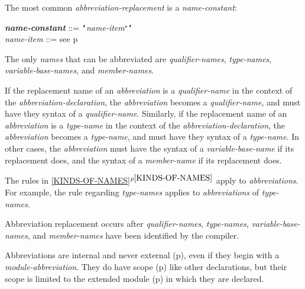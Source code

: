 \documentclass[12pt]{article}
\makeatletter
\newcommand{\TT}[1]{{\tt \bfseries #1}}
\newcommand{\emkey}[1]{{\bf \em #1}\index{#1@{\em #1}}}
\newcommand{\itemref}[1]{\ref{#1}$^{p\pageref{#1}}$}
\newcommand{\pagref}[1]{p\pageref{#1}}
\newcommand{\STAR}{{\Large $^\star$}}
\newenvironment{indpar}[1][0.3in]%
	{\begin{list}{}%
		     {\setlength{\itemsep}{0in}%
		      \setlength{\topsep}{0in}%
		      \setlength{\parsep}{1ex}%
		      \setlength{\labelwidth}{#1}%
		      \setlength{\leftmargin}{#1}%
		      \addtolength{\leftmargin}{\labelsep}}%
	 \item}%
	{\end{list}}
\makeatother
\begin{document}
The most common {\em abbreviation-replacement} is a {\em name-constant}:

\begin{indpar}
\emkey{name-constant}
    ::= \TT{`}{\em name-item}\STAR{}\TT{'} \\
{\em name-item} ::= see \pagref{NAME-ITEM}
\end{indpar}

The only {\em names}
that can be abbreviated are {\em qualifier-names},
{\em type-names}, {\em variable-base-names}, and
{\em member-names}.

If the replacement name of an {\em abbreviation} is a {\em qualifier-name}
in the context of the {\em abbreviation-declaration},
the {\em abbreviation} becomes a {\em qualifier-name}, and
must have they syntax of a {\em qualifier-name}.
Similarly, if the replacement name of an {\em abbreviation} is a {\em type-name}
in the context of the {\em abbreviation-declaration},
the {\em abbreviation} becomes a {\em type-name}, and
must have they syntax of a {\em type-name}.
In other cases, the {\em abbreviation} must have the syntax of
a {\em variable-base-name} if its replacement does, and the syntax of
a {\em member-name} if its replacement does.

The rules in \itemref{KINDS-OF-NAMES}
apply to {\em abbreviations}.  For example, the rule regarding
{\em type-names} applies to {\em abbreviations}
of {\em type-names}.

Abbreviation replacement occurs after
{\em qualifier-names},
{\em type-names}, {\em variable-base-names}, and
{\em member-names} have been identified by the compiler.

Abbreviations are internal and never external (\pagref{EXTERNAL}),%
\label{ABBREVIATIONS-ARE-INTERNAL}
even if they begin with a {\em module-abbreviation}.
They do have scope (\pagref{SCOPE}) like other declarations, but their scope
is limited to the extended module (\pagref{EXTENDED-MODULE}) in
which they are declared.
\end{document}
